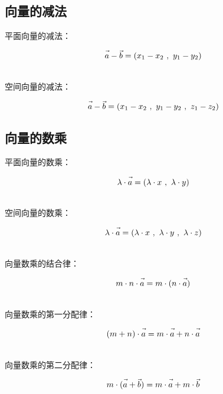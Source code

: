\documentclass[UTF8]{ctexart}
\let\nvec\vec
\def\vec#1{\nvec{\vphantom b\smash{#1}}}
\begin{document}
\subsection{向量的减法}
    平面向量的减法：
    \begin{large}
        \begin{equation*}
            \vec{a}-\vec{b}=(x_1-x_2~,~y_1-y_2)
        \end{equation*}
    \end{large}\\
    空间向量的减法：
    \begin{large}
        \begin{equation*}
            \vec{a}-\vec{b}=(x_1-x_2~,~y_1-y_2~,~z_1-z_2)
        \end{equation*}
    \end{large}

\newpage

\subsection{向量的数乘}
    平面向量的数乘：
    \begin{large}
        \begin{equation*}
            \lambda\cdot\vec{a}=\left(\lambda\cdot x~,~\lambda\cdot y\right)
        \end{equation*}
    \end{large}\\
    空间向量的数乘：
    \begin{large}
        \begin{equation*}
            \lambda\cdot\vec{a}=\left(\lambda\cdot x~,~\lambda\cdot y~,~\lambda\cdot z\right)
        \end{equation*}
    \end{large}\\
    向量数乘的结合律：
    \begin{large}
        \begin{equation*}
            m\cdot n\cdot \vec{a}=m\cdot (n\cdot\vec{a})
        \end{equation*}
    \end{large}\\
    向量数乘的第一分配律：
    \begin{large}
        \begin{equation*}
            (m+n)\cdot\vec{a}=m\cdot\vec{a}+n\cdot\vec{a}
        \end{equation*}
    \end{large}\\
    向量数乘的第二分配律：
    \begin{large}
        \begin{equation*}
            m\cdot (\vec{a}+\vec{b})=m\cdot\vec{a}+m\cdot\vec{b}
        \end{equation*}
    \end{large}
\end{document}
